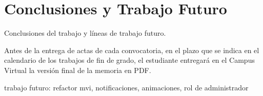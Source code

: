 \chapter{Conclusiones y Trabajo Futuro}
\label{cap:conclusiones}

Conclusiones del trabajo y líneas de trabajo futuro.

Antes de la entrega de actas de cada convocatoria, en el plazo que se indica en el calendario de los trabajos de fin de grado, el estudiante entregará en el Campus Virtual la versión final de la memoria en PDF.

trabajo futuro: refactor mvi, notificaciones, animaciones, rol de administrador


